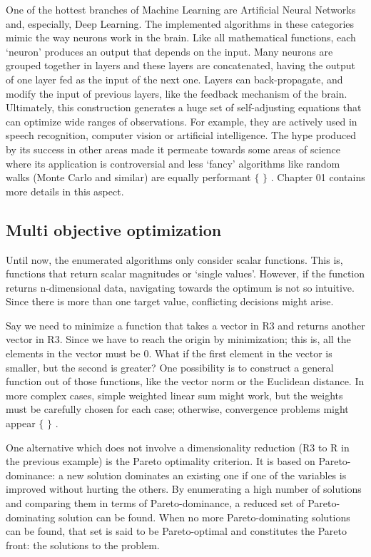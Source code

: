 One of the hottest branches of Machine Learning are Artificial Neural Networks and, especially, Deep Learning. The implemented algorithms in these categories mimic the way neurons work in the brain. Like all mathematical functions, each ‘neuron’ produces an output that depends on the input. Many neurons are grouped together in layers and these layers are concatenated, having the output of one layer fed as the input of the next one. Layers can back-propagate, and modify the input of previous layers, like the feedback mechanism of the brain. Ultimately, this construction generates a huge set of self-adjusting equations that can optimize wide ranges of observations. For example, they are actively used in speech recognition, computer vision or artificial intelligence. The hype produced by its success in other areas made it permeate towards some areas of science where its application is controversial and less ‘fancy’ algorithms like random walks (Monte Carlo and similar) are equally performant $ \{ $ $ \} $ . Chapter 01 contains more details in this aspect.

\subsection{Multi objective optimization}
Until now, the enumerated algorithms only consider scalar functions. This is, functions that return scalar magnitudes or ‘single values’. However, if the function returns n-dimensional data, navigating towards the optimum is not so intuitive. Since there is more than one target value, conflicting decisions might arise.

Say we need to minimize a function that takes a vector in R3 and returns another vector in R3. Since we have to reach the origin by minimization; this is, all the elements in the vector must be 0. What if the first element in the vector is smaller, but the second is greater? One possibility is to construct a general function out of those functions, like the vector norm or the Euclidean distance. In more complex cases, simple weighted linear sum might work, but the weights must be carefully chosen for each case; otherwise, convergence problems might appear $ \{ $ $ \} $ .

One alternative which does not involve a dimensionality reduction (R3 to R in the previous example) is the Pareto optimality criterion. It is based on Pareto-dominance: a new solution dominates an existing one if one of the variables is improved without hurting the others. By enumerating a high number of solutions and comparing them in terms of Pareto-dominance, a reduced set of Pareto-dominating solution can be found. When no more Pareto-dominating solutions can be found, that set is said to be Pareto-optimal and constitutes the Pareto front: the solutions to the problem.

